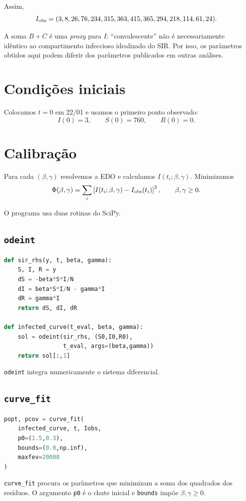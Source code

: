 \documentclass[11pt,a4paper]{article}
\begin{document}
Assim,
\[
I_{\rm obs}=(3,8,26,76,234,315,363,415,365,294,218,114,61,24).
\]

A soma $B+C$ é uma \emph{proxy} para $I$: ``convalescente'' não é
necessariamente idêntico ao compartimento infeccioso idealizado do SIR.
Por isso, os parâmetros obtidos aqui podem diferir dos parâmetros publicados
em outras análises.

\section{Condições iniciais}
Colocamos $t=0$ em 22/01 e usamos o primeiro ponto observado:
\[
I(0)=3,\qquad S(0)=760,\qquad R(0)=0.
\]

\section{Calibração}
Para cada $(\beta,\gamma)$ resolvemos a EDO e calculamos
$I(t_i;\beta,\gamma)$. Minimizamos
\[
\Phi(\beta,\gamma)=
\sum_i\left[I(t_i;\beta,\gamma)-I_{\rm obs}(t_i)\right]^2,
\qquad \beta,\gamma\geq0.
\]

O programa usa duas rotinas do SciPy.

\subsection{\texttt{odeint}}
\begin{lstlisting}[language=Python]
def sir_rhs(y, t, beta, gamma):
    S, I, R = y
    dS = -beta*S*I/N
    dI = beta*S*I/N - gamma*I
    dR = gamma*I
    return dS, dI, dR

def infected_curve(t_eval, beta, gamma):
    sol = odeint(sir_rhs, (S0,I0,R0),
                 t_eval, args=(beta,gamma))
    return sol[:,1]
\end{lstlisting}

\texttt{odeint} integra numericamente o sistema diferencial.

\subsection{\texttt{curve\_fit}}
\begin{lstlisting}[language=Python]
popt, pcov = curve_fit(
    infected_curve, t, Iobs,
    p0=(1.5,0.3),
    bounds=(0.0,np.inf),
    maxfev=20000
)
\end{lstlisting}

\texttt{curve\_fit} procura os parâmetros que minimizam a soma dos
quadrados dos resíduos. O argumento \texttt{p0} é o chute inicial e
\texttt{bounds} impõe $\beta,\gamma\geq0$.
\end{document}
